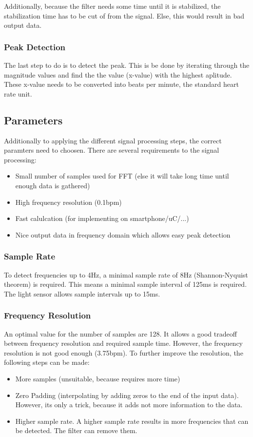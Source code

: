 \documentclass[oneside, notitlepage]{scrreprt}
\begin{document}
Additionally, because the filter needs some time until it is stabilized, the stabilization time has to be cut of from the signal. Else, this would result in bad output data.

\subsubsection{Peak Detection}
The last step to do is to detect the peak. This is be done by iterating through the magnitude values and find the the value (x-value) with the highest aplitude.
These x-value needs to be converted into beats per minute, the standard heart rate unit.

\subsection{Parameters}
Additionally to applying the different signal processing steps, the correct paramters need to choosen. There are several requirements to the signal processing:
\begin{itemize}
	\item{Small number of samples used for FFT (else it will take long time until enough data is gathered)}
	\item{High frequency resolution (0.1bpm)}
	\item{Fast calulcation (for implementing on smartphone/uC/...)}
	\item{Nice output data in frequency domain which allows easy peak detection}
\end{itemize}

\subsubsection{Sample Rate}
To detect frequencies up to 4Hz, a minimal sample rate of 8Hz (Shannon-Nyquist theorem) is required.
This means a minimal sample interval of 125ms is required. The light sensor allows sample intervals up to 15ms.

\subsubsection{Frequency Resolution}
An optimal value for the number of samples are 128. It allows a good tradeoff between frequency resolution and required sample time.
However, the frequency resolution is not good enough (3.75bpm). To further improve the resolution, the following steps can be made:

\begin{itemize}
	\item{More samples (unsuitable, because requires more time)}
	\item{Zero Padding (interpolating by adding zeros to the end of the input data). However, its only a trick, because it adds not more information to the data.}
	\item{Higher sample rate. A higher sample rate results in more frequencies that can be detected. The filter can remove them.}
\end{itemize}
\end{document}
